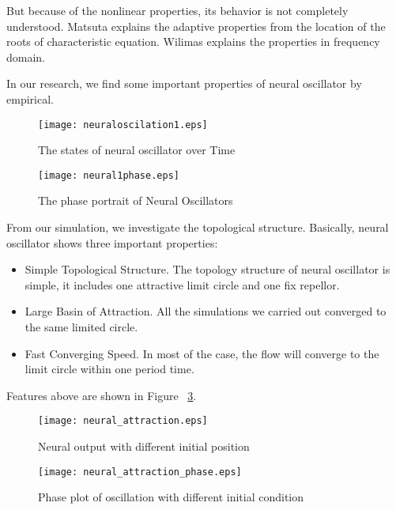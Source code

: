 But because of the nonlinear properties, its behavior is not completely understood. 
Matsuta\citep{Matsuoka1987} explains the adaptive properties from the location of the roots of  characteristic equation. 
Wilimas\citep{Williamson1998} explains the properties in frequency domain.



In our research, we find some important properties of neural oscillator by empirical.

\begin{figure}
\begin{center}
\texttt{[image: neuraloscilation1.eps]}
\end{center}
\caption{The states of neural oscillator over Time}
\label{fig:oscilation}
\end{figure}

\begin{figure}
\begin{center}
\texttt{[image: neural1phase.eps]}
\end{center}
\caption{The phase portrait of Neural Oscillators}
\label{fig:oscilationphase}
\end{figure}

From our simulation, we investigate the topological structure.
Basically, neural oscillator shows three important properties:
\begin{itemize}
\item{Simple Topological Structure.}
The topology structure of neural oscillator is simple, 
it includes one  attractive limit circle and one fix repellor.
\item{Large Basin of Attraction.}
All the simulations we carried out converged to the same limited circle.
\item{Fast Converging Speed.}
In most of the case, the flow will converge to the limit circle within one period time.
\end{itemize}

Features above are shown in Figure ~\ref{fig:time_timeAttraction}.
\begin{figure}
\begin{center}
\texttt{[image: neural\_attraction.eps]}
\end{center}
\caption{Neural output with different initial position}
\label{fig:time_timeAttraction}
\end{figure}

\begin{figure}
\begin{center}
\texttt{[image: neural\_attraction\_phase.eps]}
\end{center}
\caption{Phase plot of oscillation with different initial condition}
\label{fig:phase_attraction}
\end{figure}
 
